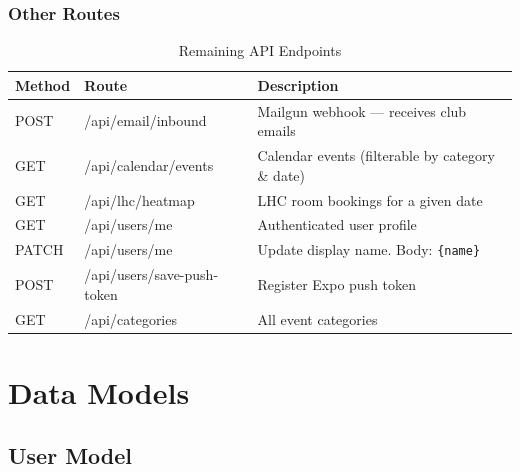 \documentclass[12pt,a4paper]{report}
\begin{document}
\subsection{Other Routes}

\begin{table}[H]
\centering
{}
\begin{tabularx}{\textwidth}{>{\ttfamily}l >{\ttfamily}l X}
\rowcolor{tableheadbg}
\color{white}\normalfont Method & \color{white}\normalfont Route & \color{white}\normalfont Description \\
\toprule
POST & /api/email/inbound          & Mailgun webhook — receives club emails          \\
GET  & /api/calendar/events        & Calendar events (filterable by category \& date) \\
GET  & /api/lhc/heatmap            & LHC room bookings for a given date              \\
GET   & /api/users/me               & Authenticated user profile                      \\
PATCH & /api/users/me               & Update display name. Body: \texttt{\{name\}}    \\
POST  & /api/users/save-push-token  & Register Expo push token                        \\
GET  & /api/categories             & All event categories                            \\
\bottomrule
\end{tabularx}
\caption{Remaining API Endpoints}
\end{table}

\chapter{Data Models}

\section{User Model}
\end{document}
